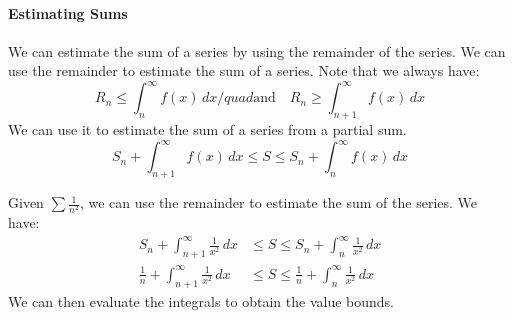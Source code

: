 \documentclass[11pt]{article}
\begin{document}
\paragraph{Estimating Sums} We can estimate the sum of a series by using the remainder of the series. We can use the remainder to estimate the sum of a series. Note that we always have:
\begin{equation}
    R_n \le \int_n^{\infty} f(x) \, dx /quad \text{and} \quad R_n \ge \int_{n+1}^{\infty} f(x) \, dx
\end{equation}
We can use it to estimate the sum of a series from a partial sum.
\begin{equation}
    S_n + \int_{n+1}^{\infty} f(x) \, dx \le S \le S_n + \int_n^{\infty} f(x) \, dx
\end{equation}
\begin{example}
    Given $\sum \frac{1}{n^2}$, we can use the remainder to estimate the sum of the series. We have:
    \begin{align*}
        S_n + \int_{n+1}^{\infty} \frac{1}{x^2} \, dx &\le S \le S_n + \int_n^{\infty} \frac{1}{x^2} \, dx \\
        \frac{1}{n} + \int_{n+1}^{\infty} \frac{1}{x^2} \, dx &\le S \le \frac{1}{n} + \int_n^{\infty} \frac{1}{x^2} \, dx
    \end{align*}
    We can then evaluate the integrals to obtain the value bounds.
\end{example}
\end{document}
